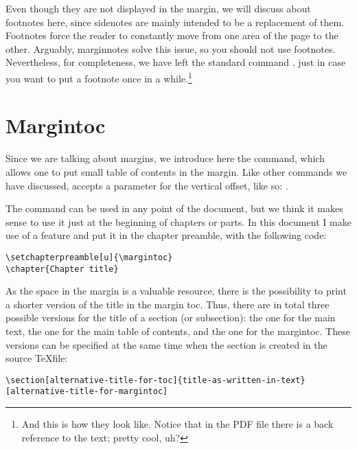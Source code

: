 Even though they are not displayed in the margin, we will discuss about 
footnotes here, since sidenotes are mainly intended to be a replacement 
of them. Footnotes force the reader to constantly move from one area of 
the page to the other. Arguably, marginnotes solve this issue, so you 
should not use footnotes. Nevertheless, for completeness, we have left 
the standard command , just in case you want to put a 
footnote once in a while.\footnote{And this is how they look like. 
Notice that in the PDF file there is a back reference to the text; 
pretty cool, uh?}

\section{Margintoc}

Since we are talking about margins, we introduce here the 
 command, which allows one to put small table of 
contents in the margin. Like other commands we have discussed, 
 accepts a parameter for the vertical offset, like 
so: .

The command can be used in any point of the document, but we think it 
makes sense to use it just at the beginning of chapters or parts. In 
this document I make use of a \KOMAScript\xspace feature and put it in 
the chapter preamble, with the following code:


\begin{lstlisting}[style=kaolstplain]
\setchapterpreamble[u]{\margintoc}
\chapter{Chapter title}
\end{lstlisting}

As the space in the margin is a valuable resource, there is the 
possibility to print a shorter version of the title in the margin toc. 
Thus, there are in total three possible versions for the title of a
section (or subsection): the one for the main text, the one for the main 
table of contents, and the one for the margintoc. These versions can be 
specified at the same time when the section is created in the source 
\TeX file:
\begin{lstlisting}[style=kaolstplain]
\section[alternative-title-for-toc]{title-as-written-in-text}[alternative-title-for-margintoc]
\end{lstlisting}

